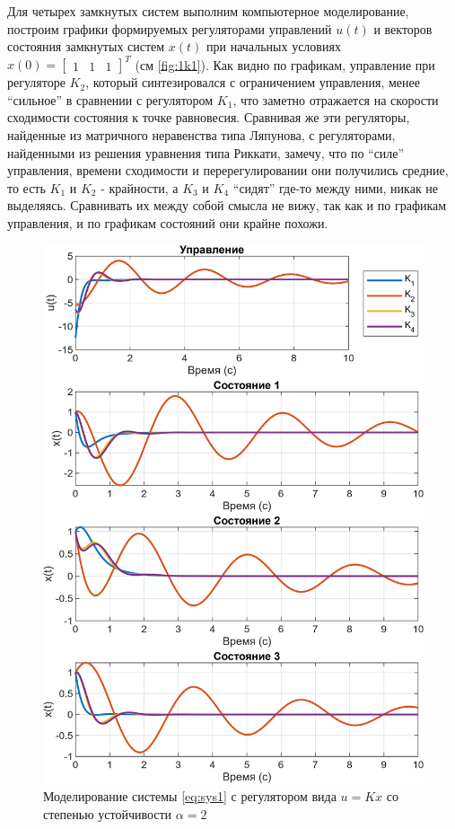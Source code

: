 Для четырех замкнутых систем выполним компьютерное моделирование,
построим графики формируемых регуляторами управлений $u(t)$ и векторов
состояния замкнутых систем $x(t)$ при начальных условиях $x(0) =\begin{bmatrix}
    1&1&1
\end{bmatrix}^T$ (см \autoref{fig:1k1}). Как видно по графикам, управление
при регуляторе $K_2$, который синтезировался с ограничением управления, менее
``сильное'' в сравнении с регулятором $K_1$, что заметно отражается на 
скорости сходимости состояния к точке равновесия. Сравнивая же эти регуляторы,
найденные из матричного неравенства типа Ляпунова, с регуляторами, найденными
из решения уравнения типа Риккати, замечу, что по ``силе'' управления, времени
сходимости и перерегулировании они получились средние, то есть 
$K_1$ и $K_2$ - крайности, а $K_3$ и $K_4$ ``сидят'' где-то между ними,
никак не выделяясь. Сравнивать их между собой смысла не вижу, так как и по 
графикам управления, и по графикам состояний они крайне похожи.

\begin{figure}[H]
    \centering
    \includegraphics[width=\linewidth]{figs/task10.png}
    \caption{Моделирование системы \eqref{eq:sys1} с регулятором вида $u=Kx$
    со степенью устойчивости $\alpha=2$}
    \label{fig:1k1}
\end{figure}




